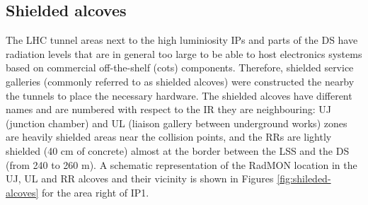 \documentclass[encoding=utf8,british]{tumphthesis}
\begin{document}
\subsection{Shielded alcoves}

The  LHC  tunnel areas next to the high luminiosity IPs and parts of the DS have radiation levels that are in general too large to be able to host electronics systems based on commercial off-the-shelf (\acrshort{cots}) components.  Therefore,  shielded service  galleries (commonly referred to as shielded alcoves) were constructed the nearby the tunnels to place the necessary hardware. The shielded alcoves have different names and are numbered with respect to the IR they are neighbouring: UJ (junction chamber) and UL (liaison gallery between underground works) zones are heavily shielded areas near the collision points, and the RRs are lightly shielded (40 cm of concrete) almost at the border between the LSS and the DS (from 240 to 260 m). A schematic representation of the RadMON location in the UJ, UL and RR alcoves and their vicinity is shown in Figures \ref{fig:shileded-alcoves}  for  the  area  right  of  IP1.
\end{document}

